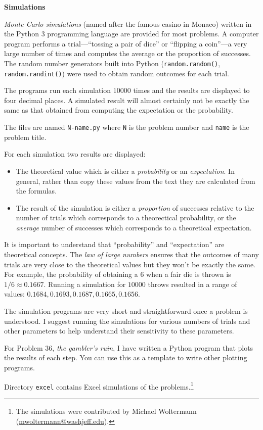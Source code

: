 \begin{center}
\textbf{\LARGE Simulations}
\end{center}


\bigskip

\emph{Monte Carlo simulations} (named after the famous casino in Monaco) written in the Python 3 programming language are provided for most problems. A computer program performs a trial---``tossing a pair of dice'' or ``flipping a coin''---a very large number of times and computes the average or the proportion of successes. The random number generators built into Python (\verb+random.random()+, \verb+random.randint()+) were used to obtain random outcomes for each trial.

The programs run each simulation $10000$ times and the results are displayed to four decimal places. A simulated result will almost certainly not be exactly the same as that obtained from computing the expectation or the probability.

The files are named \verb+N-name.py+ where \verb+N+ is the problem number and \verb+name+ is the problem title.

For each simulation two results are displayed: 
\begin{itemize}
\item The theoretical value which is either a \emph{probability} or an \emph{expectation}. In general, rather than copy these values from the text they are calculated from the formulas. 
\item The result of the simulation is either a \emph{proportion} of successes relative to the number of trials which corresponds to a theorectical probability, or the \emph{average} number of successes which corresponds to a theoretical expectation.
\end{itemize}
It is important to understand that ``probability'' and ``expectation'' are theoretical concepts. The \emph{law of large numbers} ensures that the outcomes of many trials are very close to the theoretical values but they won't be exactly the same. For example, the probability of obtaining a $6$ when a fair die is thrown is $1/6\approx 0.1667$. Running a simulation for $10000$ throws resulted in a range of values: $0.1684, 0.1693, 0.1687, 0.1665, 0.1656$.

The simulation programs are very short and straightforward once a problem is understood. I suggest running the simulations for various numbers of trials and other parameters to help understand their sensitivity to these parameters.

For Problem 36, \textit{the gambler's ruin}, I have written a Python program that plots the results of each step. You can use this as a template to write other plotting programs.

Directory \verb+excel+ contains Excel simulations of the problems.\footnote{The simulations were contributed by Michael Woltermann (\url{mwoltermann@washjeff.edu}).}
